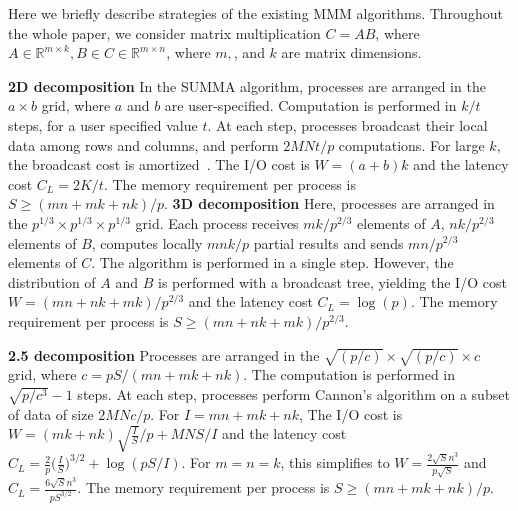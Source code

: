 \documentclass[sigplan,review,anonymous]{acmart}\settopmatter{printfolios=true,printccs=false,printacmref=false}
\newcommand\mac[1]{\textcolor{red}{[Mac: #1]}}
\newcommand{\macb}[1]{\textbf{\textsf{#1}}}
\begin{document}
Here we briefly describe strategies of the existing MMM algorithms.
 Throughout the whole paper, we consider matrix multiplication $C = 
AB$, where $A \in \mathbb{R}^{m \times k}, B \in  C \in \mathbb{R}^{m \times 
	n}$, where $m, $, and $k$ are matrix dimensions.

\macb{2D decomposition}
%
In the SUMMA algorithm, processes are arranged in the  $a \times b$ grid, where 
$a$ and $b$ are user-specified. Computation is performed in $k/t$ steps, for a 
user specified value $t$.  At each step,
processes broadcast their local data among rows and columns, and perform 
$2MNt/p$ computations. For large $k$, the broadcast cost is
amortized~\cite{summa}. The I/O cost is $W = (a+b)k$ and the 
latency cost $C_L = 2K/t$. The
memory requirement per process is $S \ge (mn + mk + nk)/p$. 
%
%
%
%
\macb{3D decomposition}
%
Here, processes are arranged in the $p^{1/3} \times
p^{1/3} \times p^{1/3}$ grid.  Each process receives $mk/p^{2/3}$ elements of 
$A$, $nk/p^{2/3}$ elements of $B$,  computes locally
$mnk/p$ partial results and sends $mn/p^{2/3}$
elements of $C$. The algorithm is performed in a single step.
However, the distribution of $A$ and $B$ is performed with a broadcast tree, 
yielding the I/O cost $W = (mn + nk+mk)/p^{2/3}$ and the latency 
cost
$C_L = \log (p)$.  The memory requirement per process is $S \ge (mn +
nk+mk)/p^{2/3}$. 

\macb{2.5 decomposition} Processes are arranged in the $\sqrt{(p/c)} \times
\sqrt{(p/c)} \times c$ grid, where $c = pS/(mn + mk + nk)$. The computation is
performed in $\sqrt{p/c^3} - 1$ steps. At each step, processes perform
Cannon's algorithm on a subset of data of size $2MNc/p$. For $I= mn + mk +
nk$, The I/O cost is $W = (mk + nk)\sqrt{\frac{I}{S}}/p + MNS/I$
and the latency cost $C_L = \frac{2}{p}\big(\frac{I}{S}\big)^{3/2} +
\log(pS/I)$. For $m=n=k$, this simplifies to $W=
\frac{2\sqrt{S}n^3}{p\sqrt{S}}$ and $C_L =
\frac{6\sqrt{S}n^3}{pS^{3/2}}$. The memory requirement per process is $S \ge
(mn + mk + nk)/p$. 
\end{document}
